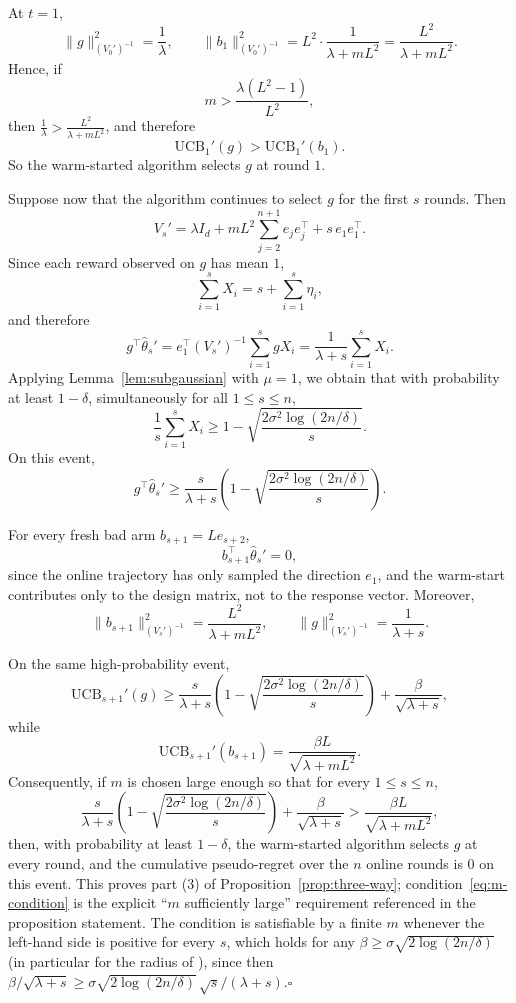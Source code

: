 \documentclass{article}
\theoremstyle{definition}
\theoremstyle{remark}
\theoremstyle{remark}
\begin{document}
At $t=1$,
\[
\|g\|_{(V_0')^{-1}}^2=\frac{1}{\lambda},
\qquad
\|b_1\|_{(V_0')^{-1}}^2
=
L^2\cdot \frac{1}{\lambda+mL^2}
=
\frac{L^2}{\lambda+mL^2}.
\]
Hence, if
\[
m > \frac{\lambda(L^2-1)}{L^2},
\]
then $\frac{1}{\lambda}>\frac{L^2}{\lambda+mL^2}$, and therefore
\[
\mathrm{UCB}_1'(g)>\mathrm{UCB}_1'(b_1).
\]
So the warm-started algorithm selects $g$ at round $1$.

Suppose now that the algorithm continues to select $g$ for the first $s$ rounds. Then
\[
V_s'
=
\lambda I_d
+
mL^2 \sum_{j=2}^{n+1} e_j e_j^\top
+
s\, e_1 e_1^\top.
\]
Since each reward observed on $g$ has mean $1$,
\[
\sum_{i=1}^s X_i = s + \sum_{i=1}^s \eta_i,
\]
and therefore
\[
g^\top \hat{\theta}_s'
=
e_1^\top (V_s')^{-1}\sum_{i=1}^s g X_i
=
\frac{1}{\lambda+s}\sum_{i=1}^s X_i.
\]
Applying Lemma~\ref{lem:subgaussian} with $\mu=1$, we obtain that with probability at least $1-\delta$, simultaneously for all $1\le s\le n$,
\[
\frac{1}{s}\sum_{i=1}^s X_i
\ge
1-\sqrt{\frac{2\sigma^2\log(2n/\delta)}{s}}.
\]
On this event,
\[
g^\top \hat{\theta}_s'
\ge
\frac{s}{\lambda+s}
\left(
1-\sqrt{\frac{2\sigma^2\log(2n/\delta)}{s}}
\right).
\]

For every fresh bad arm $b_{s+1}=Le_{s+2}$,
\[
b_{s+1}^\top \hat{\theta}_s' = 0,
\]
since the online trajectory has only sampled the direction $e_1$, and the warm-start contributes only to the design matrix, not to the response vector. Moreover,
\[
\|b_{s+1}\|_{(V_s')^{-1}}^2
=
\frac{L^2}{\lambda+mL^2},
\qquad
\|g\|_{(V_s')^{-1}}^2
=
\frac{1}{\lambda+s}.
\]

On the same high-probability event,
\[
\mathrm{UCB}_{s+1}'(g)
\ge
\frac{s}{\lambda+s}
\left(
1-\sqrt{\frac{2\sigma^2\log(2n/\delta)}{s}}
\right)
+
\frac{\beta}{\sqrt{\lambda+s}},
\]
while
\[
\mathrm{UCB}_{s+1}'(b_{s+1})
=
\frac{\beta L}{\sqrt{\lambda+mL^2}}.
\]
Consequently, if $m$ is chosen large enough so that for every $1\le s\le n$,
\begin{equation}
\label{eq:m-condition}
\frac{s}{\lambda+s}
\left(
1-\sqrt{\frac{2\sigma^2\log(2n/\delta)}{s}}
\right)
+
\frac{\beta}{\sqrt{\lambda+s}}
>
\frac{\beta L}{\sqrt{\lambda+mL^2}},
\end{equation}
then, with probability at least $1-\delta$, the warm-started algorithm selects $g$ at every round, and the cumulative pseudo-regret over the $n$ online rounds is $0$ on this event. This proves part (3) of Proposition~\ref{prop:three-way}; condition~\eqref{eq:m-condition} is the explicit ``$m$ sufficiently large'' requirement referenced in the proposition statement. The condition is satisfiable by a finite $m$ whenever the left-hand side is positive for every $s$, which holds for any $\beta\ge\sigma\sqrt{2\log(2n/\delta)}$ (in particular for the radius of \cite{abbasi2011improved}), since then $\beta/\sqrt{\lambda+s}\ge\sigma\sqrt{2\log(2n/\delta)}\,\sqrt s/(\lambda+s)$.\hfill$\square$
\end{document}

